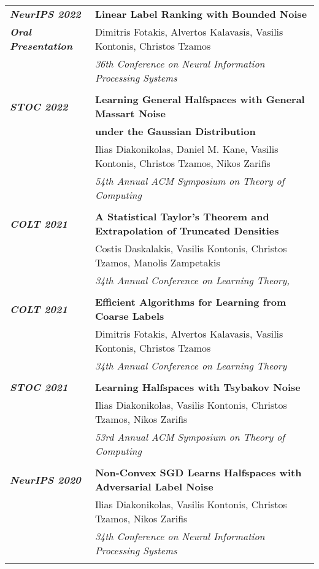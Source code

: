 \documentclass[letterpaper,11pt,oneside]{article}
\begin{document}
\begin{longtable}{@{} l l}
  \emph{\textbf{NeurIPS 2022}} &\textbf{Linear Label Ranking with Bounded Noise}\\
  \emph{\textbf{Oral Presentation}} 
 &  Dimitris Fotakis, Alvertos Kalavasis, Vasilis Kontonis, Christos Tzamos \\
 & \emph{36th Conference on Neural Information Processing Systems} \\
 & \\

\emph{\textbf{STOC 2022}}
 &\textbf{Learning General Halfspaces with General Massart Noise}\\
 & \textbf{under the Gaussian Distribution}\\
 & Ilias Diakonikolas, Daniel M. Kane, Vasilis Kontonis,
  Christos Tzamos, Nikos Zarifis \\
 & \emph{54th Annual ACM Symposium on Theory of Computing} \\
 & \\


\emph{\textbf{COLT 2021}}
 &\textbf{A Statistical Taylor's Theorem and Extrapolation of Truncated Densities}\\
 & Costis Daskalakis, Vasilis Kontonis, Christos Tzamos, Manolis Zampetakis \\
 & \emph{34th Annual Conference on Learning Theory, } \\
 & \\

\emph{\textbf{COLT 2021}}
 &\textbf{Efficient Algorithms for Learning from Coarse Labels}\\
 &  Dimitris Fotakis, Alvertos Kalavasis, Vasilis Kontonis, Christos Tzamos \\
 & \emph{34th Annual Conference on Learning Theory } \\
 & \\

\emph{\textbf{STOC 2021}}
     &\textbf{Learning Halfspaces with Tsybakov Noise}\\
     & Ilias Diakonikolas, Vasilis Kontonis, Christos Tzamos, Nikos Zarifis \\
     & \emph{53rd Annual ACM Symposium on Theory of Computing } \\
     & \\

\emph{\textbf{NeurIPS 2020}}
     &\textbf{Non-Convex SGD Learns Halfspaces with Adversarial Label Noise} \\
     & Ilias Diakonikolas, Vasilis Kontonis, Christos Tzamos, Nikos Zarifis \\
     & \emph{34th Conference on Neural Information Processing Systems} \\
     & \\


\end{longtable}
\end{document}
